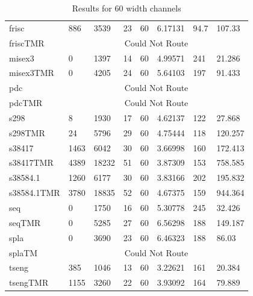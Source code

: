 \documentclass[12pt,final,oneside]{dwThesis} %
\begin{document}
\begin{table}
\begin{adjustwidth}{-1cm}{-1.2cm}
\begin{tabularx}{1.1\textwidth}{llllp{1.5cm}p{2.2cm}p{1.5cm}X}
frisc & 886 & 3539 & 23 & 60 & 6.17131 & 94.7 & 107.33\\
friscTMR & \multicolumn{7}{c}{Could Not Route} \\\midrule
misex3 & 0 & 1397 & 14 & 60 & 4.99571 & 241 & 21.286\\
misex3TMR & 0 & 4205 & 24 & 60 & 5.64103 & 197 & 91.433\\\midrule
pdc & \multicolumn{7}{c}{Could Not Route} \\
pdcTMR & \multicolumn{7}{c}{Could Not Route} \\\midrule
s298 & 8 & 1930 & 17 & 60 & 4.62137 & 122 & 27.868\\
s298TMR & 24 & 5796 & 29 & 60 & 4.75444 & 118 & 120.257\\\midrule
s38417 & 1463 & 6042 & 30 & 60 & 3.66998 & 160 & 172.413\\
s38417TMR & 4389 & 18232 & 51 & 60 & 3.87309 & 153 & 758.585\\\midrule
s38584.1 & 1260 & 6177 & 30 & 60 & 3.83166 & 202 & 195.832\\
s38584.1TMR & 3780 & 18835 & 52 & 60 & 4.67375 & 159 & 944.364\\\midrule
seq & 0 & 1750 & 16 & 60 & 5.30778 & 245 & 32.426\\
seqTMR & 0 & 5285 & 27 & 60 & 6.56298 & 188 & 149.187\\\midrule
spla & 0 & 3690 & 23 & 60 & 6.46323 & 188 & 86.03\\
splaTM & \multicolumn{7}{c}{Could Not Route}\\\midrule
tseng & 385 & 1046 & 13 & 60 & 3.22621 & 161 & 20.384\\
tsengTMR & 1155 & 3260 & 22 & 60 & 3.93092 & 164 & 79.889\\\bottomrule
    \end{tabularx}
    \caption{Results for 60 width channels}
    \label{Results60}
\end{adjustwidth}
\end{table}
\end{document}
